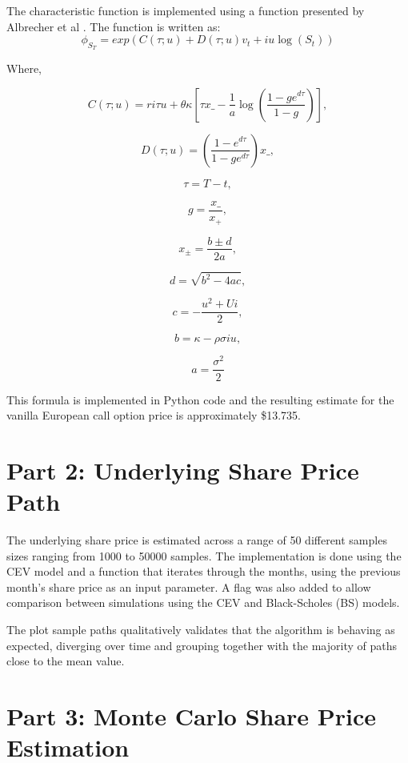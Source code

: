 \documentclass{article}
\begin{document}
The characteristic function is implemented using a function presented by Albrecher et al \cite{hestontrap}. The function is written as:
\[\phi_{S_T} = exp(C(\tau;u)+D(\tau;u)v_t + iu \log(S_t) )\]

Where,

\[C(\tau;u) = ri\tau u + \theta \kappa [\tau x\_ - \frac{1}{a}\log(\frac{1-ge^{d\tau}}{1-g})],\]

\[D(\tau;u) = (\frac{1-e^{d\tau}}{1-ge^{d\tau}})x\_,\]

\[\tau = T -t ,\]

\[ g = \frac{x\_}{x_+},\]

\[ x_\pm = \frac{b\pm d}{2a},\]

\[ d = \sqrt{b^2 - 4ac},\]

\[ c = - \frac{u^2 + Ui}{2},\]

\[ b = \kappa - \rho \sigma iu,\]

\[ a = \frac {\sigma^2}{2}\]

This formula is implemented in Python code and the resulting estimate for the vanilla European call option price is approximately \$13.735.

\section{Part 2: Underlying Share Price Path}

The underlying share price is estimated across a range of 50 different samples sizes ranging from 1000 to 50000 samples. The implementation is done using the CEV model and a function that iterates through the months, using the previous month's share price as an input parameter. A flag was also added to allow comparison between simulations using the CEV and Black-Scholes (BS) models.

\begin{center}
\end{center}

\begin{center}
\end{center}

The plot sample paths qualitatively validates that the algorithm is behaving as expected, diverging over time and grouping together with the majority of paths close to the mean value.

\section{Part 3: Monte Carlo Share Price Estimation}
\end{document}
